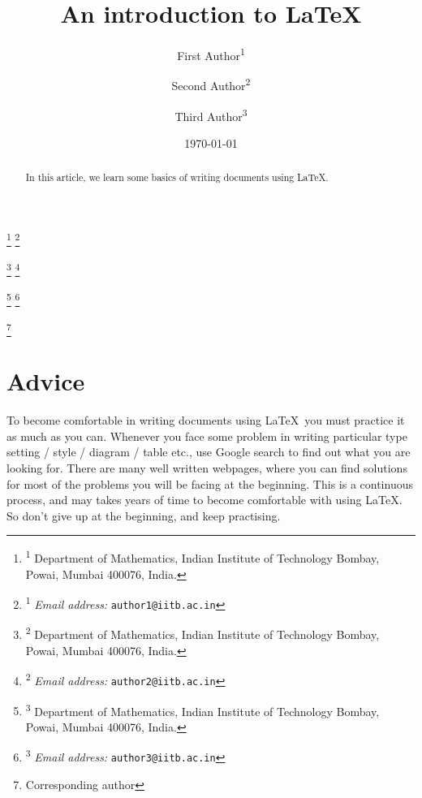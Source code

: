 \documentclass[11pt,leqno]{amsart}
\makeatletter
\numberwithin{equation}{subsection}
\theoremstyle{definition}
\newenvironment{nouppercase}{%
	\let\uppercase\relax%
	\renewcommand{\uppercasenonmath}[1]{}}{}
\newcommand\thankssymb[1]{\textsuperscript{\@fnsymbol{#1}}}
\newcommand\thanksnum[1]{\textsuperscript{#1}}
\makeatother
\begin{document}
\baselineskip=15.5pt

\title[Basics of \LaTeX]{\Huge An introduction to \LaTeX} 

\author[F. Author]{\large First Author\thanksnum{1}\thankssymb{1}}
\thanks{\thanksnum{1} Department of Mathematics, Indian Institute of Technology Bombay, Powai, Mumbai 400076, India.}
\thanks{\thanksnum{1} \textit{Email address:} \texttt{author1@iitb.ac.in}} 

\author[S. Author]{Second Author\thanksnum{2}} 
\thanks{\thanksnum{2} Department of Mathematics, Indian Institute of Technology Bombay, Powai, Mumbai 400076, India.}
\thanks{\thanksnum{2} \textit{Email address:} \texttt{author2@iitb.ac.in}} 

\author[T. Author]{Third Author\thanksnum{3}} 
\thanks{\thanksnum{3} Department of Mathematics, Indian Institute of Technology Bombay, Powai, Mumbai 400076, India.}
\thanks{\thanksnum{3} \textit{Email address:} \texttt{author3@iitb.ac.in}} 

\thanks{\thankssymb{1} Corresponding author}


\keywords{\LaTeX} 

\date{\today}


\begin{nouppercase}
	\maketitle
\end{nouppercase}

\tableofcontents

\begin{abstract}
In this article, we learn some basics of writing documents using \LaTeX. 
\end{abstract}


\section{Advice} 
To become comfortable in writing documents using \LaTeX\, you must practice it as much as you can. 
Whenever you face some problem in writing particular type setting / style / diagram / table etc., 
use Google search to find out what you are looking for. There are many well written webpages, 
where you can find solutions for most of the problems you will be facing at the beginning. 
This is a continuous process, and may takes years of time to become comfortable with using \LaTeX. 
So don't give up at the beginning, and keep practising. 
\end{document}
